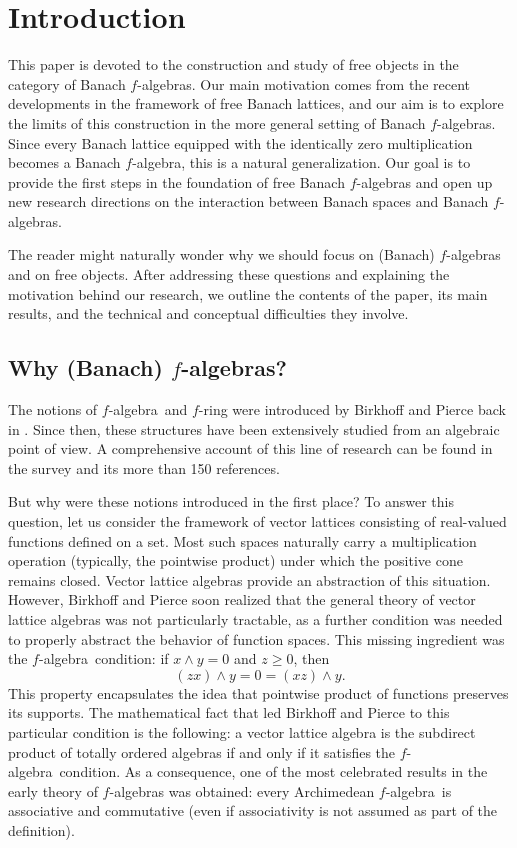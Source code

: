 \documentclass{memo-l}
\theoremstyle{definition}
\theoremstyle{remark}
\numberwithin{section}{chapter}
\numberwithin{equation}{chapter}
\newcommand{\falg}{$f\!$-algebra}
\begin{document}
\chapter*{Introduction}
This paper is devoted to the construction and study of free objects
in the category of Banach \falg s. Our main motivation comes from
the recent developments in the framework of free Banach lattices,
and our aim is to explore the limits of this construction in the
more general setting of Banach \falg s. Since every Banach lattice
equipped with the identically zero multiplication becomes a Banach
\falg, this is a natural generalization. Our goal is to provide the
first steps in the foundation of free Banach \falg s and open up new
research directions on the interaction between Banach spaces and
Banach \falg s.

The reader might naturally wonder why we should focus on (Banach)
\falg s and on free objects. After addressing these questions and
explaining the motivation behind our research, we outline the
contents of the paper, its main results, and the technical and
conceptual difficulties they involve.

\section*{Why (Banach) \falg s?}

The notions of \falg\ and $f\!$-ring were introduced by
Birkhoff and Pierce back in \cite{birkhoff_pierce1956}. Since then, these structures have
been extensively studied from an algebraic point of view. A
comprehensive account of this line of research can be found in the
survey \cite{henriksen1997} and its more than 150 references.

But why were these notions introduced in the first place? To answer this question, let us consider the framework of vector lattices consisting of real-valued functions defined on a set. Most such spaces
naturally carry a multiplication operation (typically, the pointwise
product) under which the positive cone remains closed. Vector lattice algebras provide an abstraction of this situation. However, Birkhoff and Pierce soon realized that the general
theory of vector lattice algebras was not particularly tractable, as a further condition was needed to properly abstract the behavior of function spaces. This missing ingredient was the \falg\ condition: if $x\wedge y=0$ and $z\ge 0$,
then
\[
    (zx)\wedge y=0=(xz)\wedge y.
\]
This property encapsulates the idea that pointwise product of functions preserves its
supports. The mathematical fact that led
Birkhoff and Pierce to this particular condition is the following:
a vector lattice algebra is the subdirect product
of totally ordered algebras if and only if it satisfies the \falg\
condition. As a consequence, one of the most celebrated results
in the early theory of \falg s was obtained: every Archimedean \falg\ is
associative and commutative (even if associativity is not assumed as
part of the definition).
\end{document}
